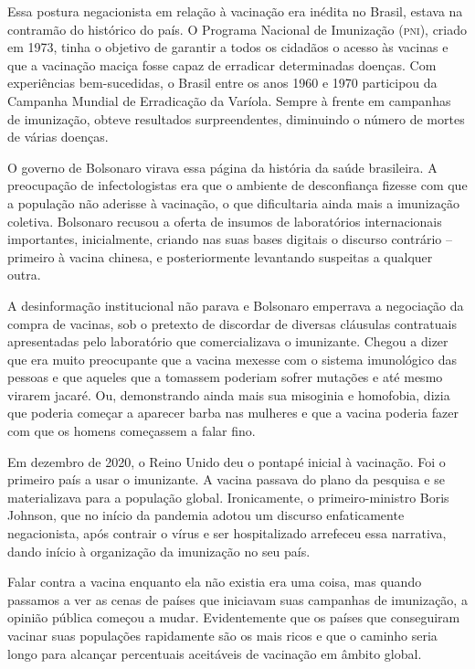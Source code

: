 Essa postura negacionista em relação à vacinação era inédita no Brasil,
estava na contramão do histórico do país. O Programa Nacional de
Imunização (\textsc{pni}), criado em 1973, tinha o objetivo de garantir a todos os
cidadãos o acesso às vacinas e que a vacinação maciça fosse capaz de
erradicar determinadas doenças. Com experiências bem-sucedidas, o Brasil
entre os anos 1960 e 1970 participou da Campanha Mundial de Erradicação
da Varíola. Sempre à frente em campanhas de imunização, obteve
resultados surpreendentes, diminuindo o número de mortes de várias
doenças.

O governo de Bolsonaro virava essa página da história da saúde
brasileira. A preocupação de infectologistas era que o ambiente de
desconfiança fizesse com que a população não aderisse à vacinação, o que
dificultaria ainda mais a imunização coletiva. Bolsonaro recusou a
oferta de insumos de laboratórios internacionais importantes,
inicialmente, criando nas suas bases digitais o discurso contrário --
primeiro à vacina chinesa, e posteriormente levantando suspeitas a
qualquer outra.

A desinformação institucional não parava e Bolsonaro emperrava a
negociação da compra de vacinas, sob o pretexto de discordar de diversas
cláusulas contratuais apresentadas pelo laboratório que comercializava o
imunizante. Chegou a dizer que era muito preocupante que a vacina
mexesse com o sistema imunológico das pessoas e que aqueles que a
tomassem poderiam sofrer mutações e até mesmo virarem jacaré. Ou,
demonstrando ainda mais sua misoginia e homofobia, dizia que poderia
começar a aparecer barba nas mulheres e que a vacina poderia fazer com
que os homens começassem a falar fino.

Em dezembro de 2020, o Reino Unido deu o pontapé inicial à vacinação.
Foi o primeiro país a usar o imunizante. A vacina passava do plano da
pesquisa e se materializava para a população global. Ironicamente, o
primeiro-ministro Boris Johnson, que no início da pandemia adotou um
discurso enfaticamente negacionista, após contrair o vírus e ser
hospitalizado arrefeceu essa narrativa, dando início à organização da
imunização no seu país.

Falar contra a vacina enquanto ela não existia era uma coisa, mas quando
passamos a ver as cenas de países que iniciavam suas campanhas de
imunização, a opinião pública começou a mudar. Evidentemente que os
países que conseguiram vacinar suas populações rapidamente são os mais
ricos e que o caminho seria longo para alcançar percentuais aceitáveis
de vacinação em âmbito global.

